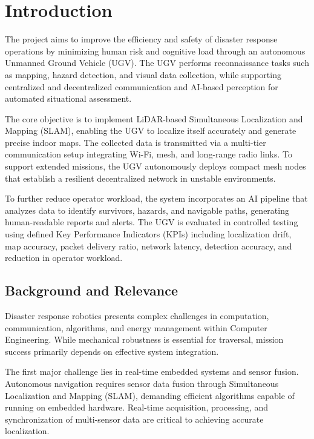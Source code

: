 
\chapter{Introduction}
\label{ch:intro}

The project aims to improve the efficiency and safety of disaster response operations by minimizing human risk and cognitive load through an autonomous Unmanned Ground Vehicle (UGV). The UGV performs reconnaissance tasks such as mapping, hazard detection, and visual data collection, while supporting centralized and decentralized communication and AI-based perception for automated situational assessment.

The core objective is to implement LiDAR-based Simultaneous Localization and Mapping (SLAM), enabling the UGV to localize itself accurately and generate precise indoor maps. The collected data is transmitted via a multi-tier communication setup integrating Wi-Fi, mesh, and long-range radio links. To support extended missions, the UGV autonomously deploys compact mesh nodes that establish a resilient decentralized network in unstable environments.

To further reduce operator workload, the system incorporates an AI pipeline that analyzes data to identify survivors, hazards, and navigable paths, generating human-readable reports and alerts. The UGV is evaluated in controlled testing using defined Key Performance Indicators (KPIs) including localization drift, map accuracy, packet delivery ratio, network latency, detection accuracy, and reduction in operator workload.

\section{Background and Relevance}
\label{sec:background}

Disaster response robotics presents complex challenges in computation, communication, algorithms, and energy management within Computer Engineering. While mechanical robustness is essential for traversal, mission success primarily depends on effective system integration.

The first major challenge lies in real-time embedded systems and sensor fusion. Autonomous navigation requires sensor data fusion through Simultaneous Localization and Mapping (SLAM), demanding efficient algorithms capable of running on embedded hardware. Real-time acquisition, processing, and synchronization of multi-sensor data are critical to achieving accurate localization.

